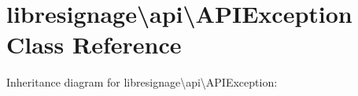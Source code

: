 \hypertarget{classlibresignage_1_1api_1_1APIException}{}\section{libresignage\textbackslash{}api\textbackslash{}A\+P\+I\+Exception Class Reference}
\label{classlibresignage_1_1api_1_1APIException}


Inheritance diagram for libresignage\textbackslash{}api\textbackslash{}A\+P\+I\+Exception\+:

